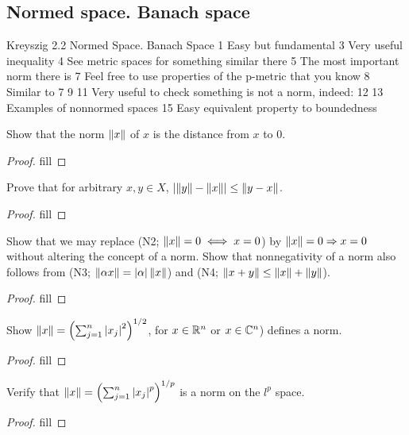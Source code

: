 \subsection{Normed space. Banach space}

Kreyszig 2.2 Normed Space. Banach Space 
1 Easy but fundamental
3 Very useful inequality
4 See metric spaces for something similar there
5 The most important norm there is
7 Feel free to use properties of the p-metric that you know
8 Similar to 7
9
11 Very useful to check something is not a norm, indeed:
12
13 Examples of nonnormed spaces 
15 Easy equivalent property to boundedness

\begin{exercise}{1}
Show that the norm $\left\lVert x\right\rVert$ of $x$ is the distance from $x$ to 0.
\end{exercise}
\begin{proof}
fill
\end{proof}

\begin{exercise}{3}
Prove that for arbitrary $x,y\in X$, $\left\lvert \left\lVert y\right\rVert-\left\lVert x\right\rVert\right\rvert\leq \left\lVert y-x\right\rVert$.
\end{exercise}
\begin{proof}
fill
\end{proof}

\begin{exercise}{4}
Show that we may replace (N2; $\left\lVert x\right\rVert=0\iff x=0$) by $\left\lVert x\right\rVert=0\Rightarrow x=0$ without altering the concept of a norm. Show that nonnegativity of a norm also follows from (N3; $\left\lVert \alpha x\right\rVert=\left\lvert \alpha\right\rvert\left\lVert x\right\rVert$) and (N4; $\left\lVert x+y\right\rVert\leq \left\lVert x\right\rVert+\left\lVert y\right\rVert$).
\end{exercise}
\begin{proof}
fill
\end{proof}

\begin{exercise}{5}
Show $\left\lVert x\right\rVert=\left(\sum_{j=1}^n\left\lvert x_j\right\rvert^2\right)^{1/2}$, for $x\in\mathbb{R}^n$ or $x\in\mathbb{C}^n$) defines a norm.
\end{exercise}
\begin{proof}
fill
\end{proof}

\begin{exercise}{7}
Verify that $\left\lVert x\right\rVert=\left(\sum_{j=1}^n\left\lvert x_j\right\rvert^p\right)^{1/p}$ is a norm on the $l^p$ space.
\end{exercise}
\begin{proof}
fill
\end{proof}

